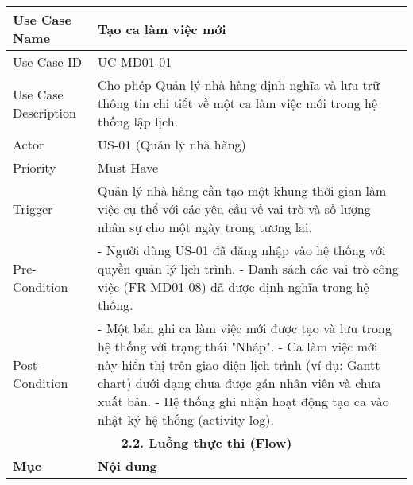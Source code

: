 \begin{longtable}{|m{4cm}|p{11cm}|}
Use Case Name & Tạo ca làm việc mới \\
\hline
Use Case ID & UC-MD01-01 \\
\hline
Use Case Description & Cho phép Quản lý nhà hàng định nghĩa và lưu trữ thông tin chi tiết về một ca làm việc mới trong hệ thống lập lịch. \\
\hline
Actor & US-01 (Quản lý nhà hàng) \\
\hline
Priority & Must Have \\
\hline
Trigger & Quản lý nhà hàng cần tạo một khung thời gian làm việc cụ thể với các yêu cầu về vai trò và số lượng nhân sự cho một ngày trong tương lai. \\
\hline
Pre-Condition & - Người dùng US-01 đã đăng nhập vào hệ thống với quyền quản lý lịch trình. \newline - Danh sách các vai trò công việc (FR-MD01-08) đã được định nghĩa trong hệ thống. \\
\hline
Post-Condition & - Một bản ghi ca làm việc mới được tạo và lưu trong hệ thống với trạng thái "Nháp". \newline - Ca làm việc mới này hiển thị trên giao diện lịch trình (ví dụ: Gantt chart) dưới dạng chưa được gán nhân viên và chưa xuất bản. \newline - Hệ thống ghi nhận hoạt động tạo ca vào nhật ký hệ thống (activity log). \\
\hline
\multicolumn{2}{|c|}{\textbf{2.2. Luồng thực thi (Flow)}} \\
\hline
\textbf{Mục} & \textbf{Nội dung} \\
\hline

\end{longtable}
